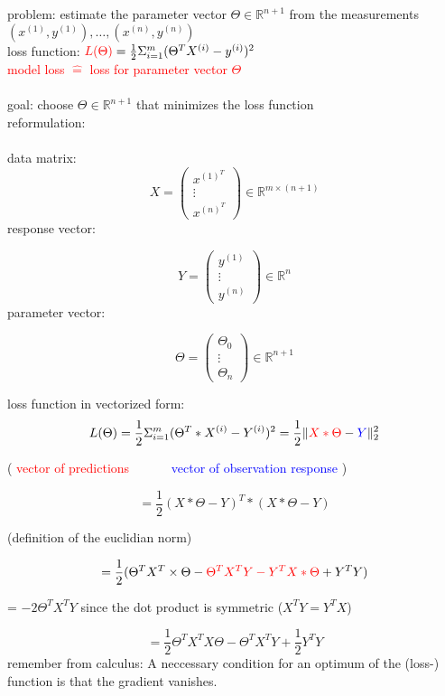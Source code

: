 	\noindent problem: estimate the parameter vector $\Theta \in \mathbb{R}^{n+1}$ from the measurements $(x^{(1)}, y^{(1)}), \dots , (x^{(n)}, y^{(n)})$\\
	loss function: $\textcolor{red}{L(\Theta)} = \frac{1}{2} \Sigma^m_{i=1} (\Theta^T X^{(i)} - y^{(i)})^2$\\
	\textcolor{red}{model loss $\hat{=}$ loss for parameter vector $\Theta$}\\\\
	goal: choose $\Theta \in \mathbb{R}^{n+1}$ that minimizes the loss function\\
	reformulation:\\\\
	data matrix:
	\[ X =\left( \begin{array}{ccc}
	x^{(1)^T} \\
	\vdots \\
	x^{(n)^T} \end{array} \right) \in \mathbb{R}^{m \times (n+1)}\]
	response vector:
	
	\[ Y =\left( \begin{array}{ccc}
	y^{(1)} \\
	\vdots \\
	y^{(n)} \end{array} \right) \in \mathbb{R}^n\]
	parameter vector:
	
	\[ \Theta =\left( \begin{array}{ccc}
	\Theta_0 \\
	\vdots \\
	\Theta_n \end{array} \right) \in \mathbb{R}^{n+1}\]

	loss function in vectorized form:
	\[L(\Theta) = \frac{1}{2} \Sigma^m_{i=1} (\Theta^T * X^{(i)} - Y^{(i)})^2 = \frac{1}{2} \lVert \textcolor{red}{X * \Theta} - \textcolor{blue}{Y} \lVert^2_2\]
	
	\begin{center}
	( \textcolor{red}{vector of predictions}$\quad\quad\quad$ \textcolor{blue}{vector of observation response} )
	\end{center}
	\[ = \frac{1}{2} (X * \Theta -Y)^T * (X * \Theta - Y)\]
	\begin{center}
	(definition of the euclidian norm)
	\end{center}
	\[ = \frac{1}{2} (\Theta^T X^T \times \Theta - \textcolor{red}{\Theta^T X^T Y - Y^T X*\Theta} + Y^T Y)\]
	\begin{center}
	= $-2 \Theta^T X^T Y$ since the dot product is symmetric ($X^T Y = Y^T X$)
	\end{center}
	\[= \frac{1}{2} \Theta^T X^T X \Theta - \Theta^T X^T Y + \frac{1}{2} Y^T Y\]
	remember from calculus: A neccessary condition for an optimum of the (loss-) function is that the gradient vanishes.\\
	

